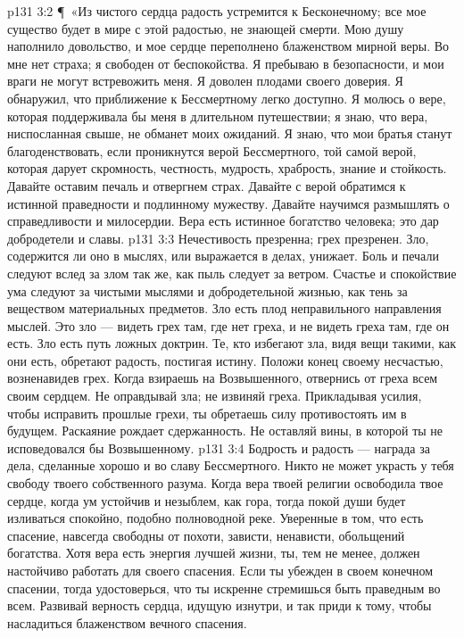 \vs p131 3:2 \P\ «Из чистого сердца радость устремится к Бесконечному; все мое существо будет в мире с этой радостью, не знающей смерти. Мою душу наполнило довольство, и мое сердце переполнено блаженством мирной веры. Во мне нет страха; я свободен от беспокойства. Я пребываю в безопасности, и мои враги не могут встревожить меня. Я доволен плодами своего доверия. Я обнаружил, что приближение к Бессмертному легко доступно. Я молюсь о вере, которая поддерживала бы меня в длительном путешествии; я знаю, что вера, ниспосланная свыше, не обманет моих ожиданий. Я знаю, что мои братья станут благоденствовать, если проникнутся верой Бессмертного, той самой верой, которая дарует скромность, честность, мудрость, храбрость, знание и стойкость. Давайте оставим печаль и отвергнем страх. Давайте с верой обратимся к истинной праведности и подлинному мужеству. Давайте научимся размышлять о справедливости и милосердии. Вера есть истинное богатство человека; это дар добродетели и славы.
\vs p131 3:3 Нечестивость презренна; грех презренен. Зло, содержится ли оно в мыслях, или выражается в делах, унижает. Боль и печали следуют вслед за злом так же, как пыль следует за ветром. Счастье и спокойствие ума следуют за чистыми мыслями и добродетельной жизнью, как тень за веществом материальных предметов. Зло есть плод неправильного направления мыслей. Это зло --- видеть грех там, где нет греха, и не видеть греха там, где он есть. Зло есть путь ложных доктрин. Те, кто избегают зла, видя вещи такими, как они есть, обретают радость, постигая истину. Положи конец своему несчастью, возненавидев грех. Когда взираешь на Возвышенного, отвернись от греха всем своим сердцем. Не оправдывай зла; не извиняй греха. Прикладывая усилия, чтобы исправить прошлые грехи, ты обретаешь силу противостоять им в будущем. Раскаяние рождает сдержанность. Не оставляй вины, в которой ты не исповедовался бы Возвышенному.
\vs p131 3:4 Бодрость и радость --- награда за дела, сделанные хорошо и во славу Бессмертного. Никто не может украсть у тебя свободу твоего собственного разума. Когда вера твоей религии освободила твое сердце, когда ум устойчив и незыблем, как гора, тогда покой души будет изливаться спокойно, подобно полноводной реке. Уверенные в том, что есть спасение, навсегда свободны от похоти, зависти, ненависти, обольщений богатства. Хотя вера есть энергия лучшей жизни, ты, тем не менее, должен настойчиво работать для своего спасения. Если ты убежден в своем конечном спасении, тогда удостоверься, что ты искренне стремишься быть праведным во всем. Развивай верность сердца, идущую изнутри, и так приди к тому, чтобы насладиться блаженством вечного спасения.
